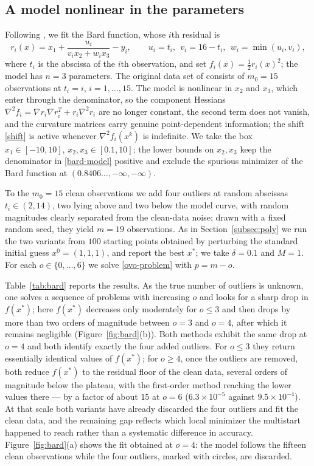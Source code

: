 \documentclass[11pt]{article}
\begin{document}
\subsection{A model nonlinear in the parameters} \label{subsec:bard}

Following \cite{mgh}, we fit the Bard function, whose $i$th residual is
\begin{equation} \label{bard-model}
r_i(x) = x_1 + \frac{u_i}{v_i x_2 + w_i x_3} - y_i, \qquad
u_i = t_i,\ \ v_i = 16 - t_i,\ \ w_i = \min(u_i, v_i),
\end{equation}
where $t_i$ is the abscissa of the $i$th observation, and set
$f_i(x) = \tfrac12 r_i(x)^2$; the model has $n = 3$ parameters. The original
data set of \cite{mgh} consists of $m_0 = 15$ observations at $t_i = i$,
$i = 1, \dots, 15$. The model is nonlinear in $x_2$ and $x_3$, which
enter through the denominator, so the component Hessians
$\nabla^2 f_i = \nabla r_i \nabla r_i^T + r_i \nabla^2 r_i$ are no longer
constant, the second term does not vanish, and the curvature matrices carry
genuine point-dependent information; the shift \eqref{shift} is active
whenever $\nabla^2 f_i(x^k)$ is indefinite. We
take the box $x_1 \in [-10, 10]$, $x_2, x_3 \in [0.1, 10]$; the lower bounds on
$x_2, x_3$ keep the denominator in \eqref{bard-model} positive and exclude the
spurious minimizer of the Bard function at $(0.8406\ldots, -\infty, -\infty)$.

To the $m_0 = 15$ clean observations we add four outliers at random abscissas
$t_i \in (2, 14)$, two lying above and two below the model curve, with random
magnitudes clearly separated from the clean-data noise; drawn with a fixed
random seed, they yield $m = 19$ observations. As in Section~\ref{subsec:poly}
we run the two variants from $100$ starting points obtained by perturbing the
standard initial guess $x^0 = (1,1,1)$, and report the best $x^*$; we take
$\delta = 0.1$ and $M = 1$. For each $o \in \{0, \dots, 6\}$ we solve
\eqref{ovo-problem} with $p = m - o$.

Table~\ref{tab:bard} reports the results. As the true number of outliers is
unknown, one solves a sequence of problems with increasing $o$ and looks for a
sharp drop in $f(x^*)$; here $f(x^*)$ decreases only moderately for $o \le 3$
and then drops by more than two orders of magnitude between $o = 3$ and $o = 4$,
after which it remains negligible (Figure~\ref{fig:bard}(b)). Both methods exhibit the same drop at $o = 4$
and both identify exactly the four added outliers. For $o \le 3$ they return
essentially identical values of $f(x^*)$; for $o \ge 4$, once the outliers are
removed, both reduce $f(x^*)$ to the residual floor of the clean data, several
orders of magnitude below the plateau, with the first-order method reaching the
lower values there --- by a factor of about $15$ at $o = 6$
($6.3\times10^{-5}$ against $9.5\times10^{-4}$). At that scale both variants
have already discarded the four outliers and fit the clean data, and the
remaining gap reflects which local minimizer the multistart happened to reach
rather than a systematic difference in accuracy. Figure~\ref{fig:bard}(a) shows the fit
obtained at $o = 4$: the model follows the fifteen clean observations while the
four outliers, marked with circles, are discarded.
\end{document}
